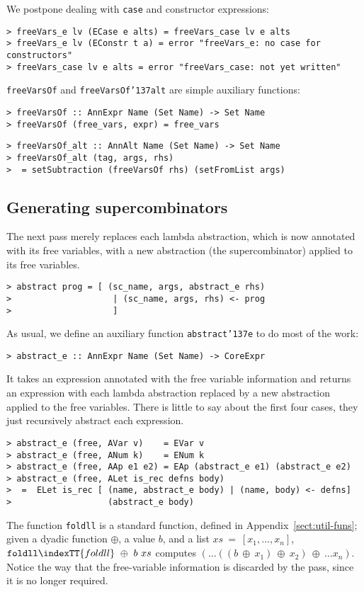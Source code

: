 We postpone dealing with \mbox{\tt case} and constructor expressions:
\begin{verbatim}
> freeVars_e lv (ECase e alts) = freeVars_case lv e alts
> freeVars_e lv (EConstr t a) = error "freeVars_e: no case for constructors"
> freeVars_case lv e alts = error "freeVars_case: not yet written"
\end{verbatim}
\mbox{\tt freeVarsOf} and \mbox{\tt freeVarsOf{\char'137}alt} are simple auxiliary functions:
\begin{verbatim}
> freeVarsOf :: AnnExpr Name (Set Name) -> Set Name
> freeVarsOf (free_vars, expr) = free_vars
\end{verbatim}
%
%
\begin{verbatim}
> freeVarsOf_alt :: AnnAlt Name (Set Name) -> Set Name
> freeVarsOf_alt (tag, args, rhs)
>  = setSubtraction (freeVarsOf rhs) (setFromList args)
\end{verbatim}
\subsection{Generating supercombinators}
\label{ll:abstract}

The next pass merely replaces each lambda abstraction, which is now
annotated with its free variables, with a new abstraction (the
supercombinator) applied to its free variables.
\begin{verbatim}
> abstract prog = [ (sc_name, args, abstract_e rhs)
>                    | (sc_name, args, rhs) <- prog
>                    ]
\end{verbatim}
%
As usual, we define an auxiliary function \mbox{\tt abstract{\char'137}e} to do most of
the work:
\begin{verbatim}
> abstract_e :: AnnExpr Name (Set Name) -> CoreExpr
\end{verbatim}
It takes an expression annotated with the free variable information
and returns an expression with each lambda abstraction replaced by a
new abstraction applied to the free variables. There is little to say
about the first four cases, they just recursively abstract each
expression.
\begin{verbatim}
> abstract_e (free, AVar v)    = EVar v
> abstract_e (free, ANum k)    = ENum k
> abstract_e (free, AAp e1 e2) = EAp (abstract_e e1) (abstract_e e2)
> abstract_e (free, ALet is_rec defns body)
>  =  ELet is_rec [ (name, abstract_e body) | (name, body) <- defns]
>                   (abstract_e body)
\end{verbatim}
The function \mbox{\tt foldll} is a standard function, defined in
Appendix~\ref{sect:util-funs}; given a dyadic function $\oplus$, a
value $b$, and a list $xs\ =\ [x_1,...,x_n]$, $\mbox{\tt foldll}\indexTT{foldll}\ \oplus\ b\
xs$ computes $( \ldots ((b~ \oplus~ x_1)~ \oplus~ x_2)~ \oplus~ \ldots
x_n)$.  Notice the way that the free-variable information is discarded
by the pass, since it is no longer required.

